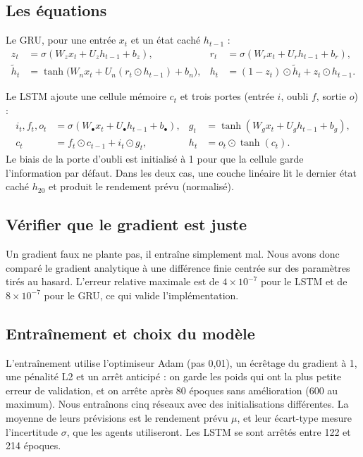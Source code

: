 \documentclass[11pt,a4paper]{article}
\begin{document}
\subsection{Les équations}

Le GRU, pour une entrée $x_t$ et un état caché $h_{t-1}$ :
\begin{align*}
z_t&=\sigma(W_z x_t+U_z h_{t-1}+b_z), & r_t&=\sigma(W_r x_t+U_r h_{t-1}+b_r),\\
\tilde h_t&=\tanh\big(W_n x_t+U_n(r_t\odot h_{t-1})+b_n\big), & h_t&=(1-z_t)\odot\tilde h_t+z_t\odot h_{t-1}.
\end{align*}

Le LSTM ajoute une cellule mémoire $c_t$ et trois portes (entrée $i$, oubli $f$, sortie $o$) :
\begin{align*}
i_t,f_t,o_t&=\sigma(W_\bullet x_t+U_\bullet h_{t-1}+b_\bullet), & g_t&=\tanh(W_g x_t+U_g h_{t-1}+b_g),\\
c_t&=f_t\odot c_{t-1}+i_t\odot g_t, & h_t&=o_t\odot\tanh(c_t).
\end{align*}
Le biais de la porte d'oubli est initialisé à 1 pour que la cellule garde l'information par défaut. Dans les deux cas, une couche linéaire lit le dernier
état caché $h_{20}$ et produit le rendement prévu (normalisé).

\subsection{Vérifier que le gradient est juste}

Un gradient faux ne plante pas, il entraîne simplement mal. Nous avons donc comparé le gradient analytique à une différence finie centrée sur des
paramètres tirés au hasard. L'erreur relative maximale est de $4\times10^{-7}$ pour le LSTM et de $8\times10^{-7}$ pour le GRU, ce qui valide
l'implémentation.

\subsection{Entraînement et choix du modèle}

L'entraînement utilise l'optimiseur Adam (pas 0,01), un écrêtage du gradient à 1, une pénalité L2 et un arrêt anticipé : on garde les poids qui ont la
plus petite erreur de validation, et on arrête après 80 époques sans amélioration (600 au maximum). Nous entraînons cinq réseaux avec des
initialisations différentes. La moyenne de leurs prévisions est le rendement prévu $\mu$, et leur écart-type mesure l'incertitude $\sigma$, que les agents
utiliseront. Les LSTM se sont arrêtés entre 122 et 214 époques.
\end{document}
